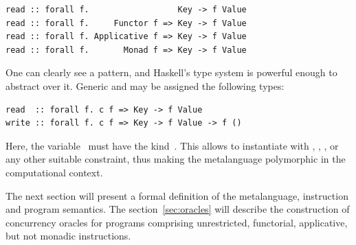 \begin{verbatim}
read :: forall f.                  Key -> f Value
read :: forall f.     Functor f => Key -> f Value
read :: forall f. Applicative f => Key -> f Value
read :: forall f.       Monad f => Key -> f Value
\end{verbatim}

\noindent
One can clearly see a pattern, and Haskell's type system is powerful enough to
abstract over it. Generic  and  may be assigned the
following types:

\begin{verbatim}
read  :: forall f. c f => Key -> f Value
write :: forall f. c f => Key -> f Value -> f ()
\end{verbatim}

\noindent
Here, the variable~ must have the kind~. This allows
to instantiate  with , , ,
 or any other suitable constraint, thus making the metalanguage
polymorphic in the computational context.

The next section will present a formal definition of the metalanguage, instruction
and program semantics. The section~\ref{sec:oracles} will describe the construction
of concurrency oracles for programs comprising unrestricted, functorial,
applicative, but not monadic instructions.
